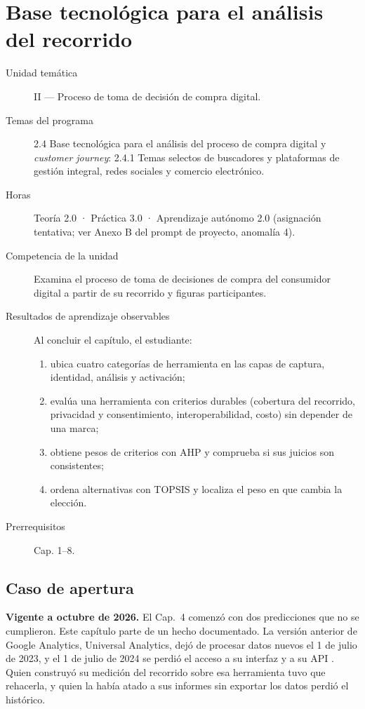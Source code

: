 \chapter{Base tecnológica para el análisis del recorrido}
\label{cap:09}

\begin{cajaFicha}
\begin{description}
  \item[Unidad temática] II — Proceso de toma de decisión de compra digital.
  \item[Temas del programa] 2.4 Base tecnológica para el análisis del proceso de compra digital y \textit{customer journey}: 2.4.1 Temas selectos de buscadores y plataformas de gestión integral, redes sociales y comercio electrónico.
  \item[Horas] Teoría 2.0 · Práctica 3.0 · Aprendizaje autónomo 2.0 (asignación tentativa; ver Anexo B del prompt de proyecto, anomalía 4).
  \item[Competencia de la unidad] Examina el proceso de toma de decisiones de compra del consumidor digital a partir de su recorrido y figuras participantes.
  \item[Resultados de aprendizaje observables] Al concluir el capítulo, el estudiante:
  \begin{enumerate}
    \item ubica cuatro categorías de herramienta en las capas de captura, identidad, análisis y activación;
    \item evalúa una herramienta con criterios durables (cobertura del recorrido, privacidad y consentimiento, interoperabilidad, costo) sin depender de una marca;
    \item obtiene pesos de criterios con AHP y comprueba si sus juicios son consistentes;
    \item ordena alternativas con TOPSIS y localiza el peso en que cambia la elección.
  \end{enumerate}
  \item[Prerrequisitos] Cap. 1--8.
\end{description}
\end{cajaFicha}

\section{Caso de apertura}

\textbf{Vigente a octubre de 2026.} El Cap.~4 comenzó con dos predicciones que
no se cumplieron. Este capítulo parte de un hecho documentado. La versión
anterior de Google Analytics, Universal Analytics, dejó de procesar datos
nuevos el 1 de julio de 2023, y el 1 de julio de 2024 se perdió el acceso a
su interfaz y a su API \parencite{google2026ga4ua}. Quien construyó su
medición del recorrido sobre esa herramienta tuvo que rehacerla, y quien la
había atado a sus informes sin exportar los datos perdió el histórico.

